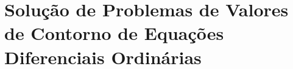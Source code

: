 \chapter{Solução de Problemas de Valores de Contorno de Equações Diferenciais Ordinárias}





%

%

%

%

%

%


